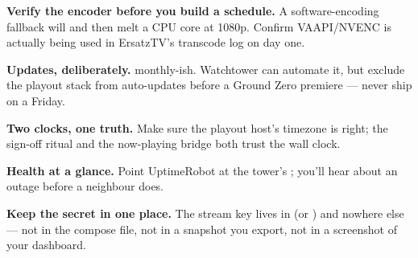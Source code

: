 \documentclass[fontpath=fonts/,logopath=logo/]{riposte-doc}
\begin{document}

\begin{ripbullets}
\item \textbf{Verify the encoder before you build a schedule.} A software-encoding fallback will  and then melt a CPU core at 1080p. Confirm VAAPI/NVENC is actually being used in ErsatzTV's transcode log on day one.
\item \textbf{Updates, deliberately.}  monthly-ish. Watchtower can automate it, but exclude the playout stack from auto-updates before a Ground Zero premiere — never ship on a Friday.
\item \textbf{Two clocks, one truth.} Make sure the playout host's timezone is right; the sign-off ritual and the now-playing bridge both trust the wall clock.
\item \textbf{Health at a glance.} Point UptimeRobot at the tower's ; you'll hear about an outage before a neighbour does.
\item \textbf{Keep the secret in one place.} The stream key lives in  (or ) and nowhere else — not in the compose file, not in a snapshot you export, not in a screenshot of your dashboard.
\end{ripbullets}


\ripend
\end{document}
